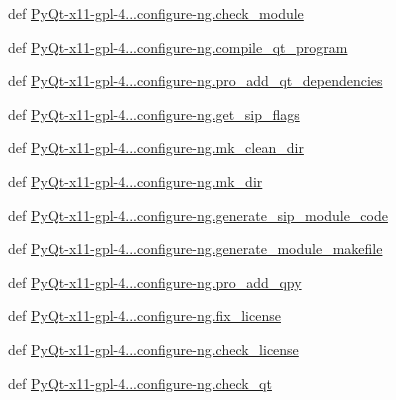 \begin{DoxyCompactItemize}
def \hyperlink{namespacePyQt-x11-gpl-4_811_82_1_1configure-ng_a3e5d929fd3a613633695502cdcf3f259}{Py\+Qt-\/x11-\/gpl-\/4...\+configure-\/ng.\+check\+\_\+module}
\item 
def \hyperlink{namespacePyQt-x11-gpl-4_811_82_1_1configure-ng_a8554a4b65b9674e0307100ff0c673ea7}{Py\+Qt-\/x11-\/gpl-\/4...\+configure-\/ng.\+compile\+\_\+qt\+\_\+program}
\item 
def \hyperlink{namespacePyQt-x11-gpl-4_811_82_1_1configure-ng_a464d12c4cb3bf7718d1b020d3ffb6cc9}{Py\+Qt-\/x11-\/gpl-\/4...\+configure-\/ng.\+pro\+\_\+add\+\_\+qt\+\_\+dependencies}
\item 
def \hyperlink{namespacePyQt-x11-gpl-4_811_82_1_1configure-ng_a5ecca4523500b8b0bdf2e7f624d09335}{Py\+Qt-\/x11-\/gpl-\/4...\+configure-\/ng.\+get\+\_\+sip\+\_\+flags}
\item 
def \hyperlink{namespacePyQt-x11-gpl-4_811_82_1_1configure-ng_a5108711a6c61e7621818670beebee79f}{Py\+Qt-\/x11-\/gpl-\/4...\+configure-\/ng.\+mk\+\_\+clean\+\_\+dir}
\item 
def \hyperlink{namespacePyQt-x11-gpl-4_811_82_1_1configure-ng_a060bc254366d030528363b353636769f}{Py\+Qt-\/x11-\/gpl-\/4...\+configure-\/ng.\+mk\+\_\+dir}
\item 
def \hyperlink{namespacePyQt-x11-gpl-4_811_82_1_1configure-ng_ac5a77a03ede8ec10fda10e92e7074a97}{Py\+Qt-\/x11-\/gpl-\/4...\+configure-\/ng.\+generate\+\_\+sip\+\_\+module\+\_\+code}
\item 
def \hyperlink{namespacePyQt-x11-gpl-4_811_82_1_1configure-ng_ae9da499758452582fea25d49d8a96cb1}{Py\+Qt-\/x11-\/gpl-\/4...\+configure-\/ng.\+generate\+\_\+module\+\_\+makefile}
\item 
def \hyperlink{namespacePyQt-x11-gpl-4_811_82_1_1configure-ng_a8c6e5b7f2178d9fe03272ab7f2d0ebda}{Py\+Qt-\/x11-\/gpl-\/4...\+configure-\/ng.\+pro\+\_\+add\+\_\+qpy}
\item 
def \hyperlink{namespacePyQt-x11-gpl-4_811_82_1_1configure-ng_a19df9e1167a3059be792f8d1901b0339}{Py\+Qt-\/x11-\/gpl-\/4...\+configure-\/ng.\+fix\+\_\+license}
\item 
def \hyperlink{namespacePyQt-x11-gpl-4_811_82_1_1configure-ng_a10dbb647a56b684779cd1cf6f14108ad}{Py\+Qt-\/x11-\/gpl-\/4...\+configure-\/ng.\+check\+\_\+license}
\item 
def \hyperlink{namespacePyQt-x11-gpl-4_811_82_1_1configure-ng_a4b6f229e17a278e1b2417984a6ef58ab}{Py\+Qt-\/x11-\/gpl-\/4...\+configure-\/ng.\+check\+\_\+qt}
\item 

\end{DoxyCompactItemize}
